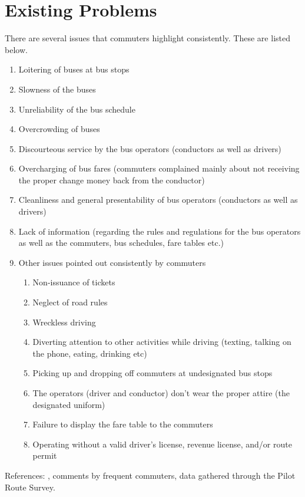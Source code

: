 \section{Existing Problems}
\label{section-ExistingProblems}
There are several issues that commuters highlight consistently. These are listed below. 
\begin {enumerate}
\item Loitering of buses at bus stops
\item Slowness of the buses
\item Unreliability of the bus schedule
\item Overcrowding of buses
\item Discourteous service by the bus operators (conductors as well as drivers)
\item Overcharging of bus fares (commuters complained mainly about not receiving the proper change money back from the conductor)
\item Cleanliness and general presentability of bus operators (conductors as well as drivers)
\item Lack of information (regarding the rules and regulations for the bus operators as well as the commuters, bus schedules, fare tables etc.)
\item Other issues pointed out consistently by commuters
	\begin {enumerate}
	\item Non-issuance of tickets
	\item Neglect of road rules
	\item Wreckless driving
	\item Diverting attention to other activities while driving (texting, talking on the phone, eating, drinking etc)
	\item Picking up and dropping off commuters at undesignated bus stops
	\item The operators (driver and conductor) don't wear the proper attire (the designated uniform)
	\item Failure to display the fare table to the commuters
	\item Operating without a valid driver's license, revenue license, and/or route permit
	\end {enumerate}
\end {enumerate}
References: \cite{Wickremasekara2012, Range2012}, comments by frequent commuters, data gathered through the Pilot Route Survey.

